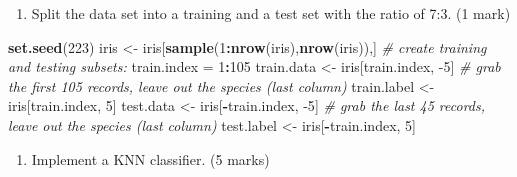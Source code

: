 \documentclass[
]{article}
\newenvironment{Shaded}{\begin{snugshade}}{\end{snugshade}}
\newcommand{\CommentTok}[1]{\textcolor[rgb]{0.56,0.35,0.01}{\textit{#1}}}
\newcommand{\DecValTok}[1]{\textcolor[rgb]{0.00,0.00,0.81}{#1}}
\newcommand{\KeywordTok}[1]{\textcolor[rgb]{0.13,0.29,0.53}{\textbf{#1}}}
\newcommand{\NormalTok}[1]{#1}
\newcommand{\OperatorTok}[1]{\textcolor[rgb]{0.81,0.36,0.00}{\textbf{#1}}}
\newcommand{\StringTok}[1]{\textcolor[rgb]{0.31,0.60,0.02}{#1}}
\providecommand{\tightlist}{%
  \setlength{\itemsep}{0pt}\setlength{\parskip}{0pt}}
\begin{document}
\begin{enumerate}
\def\labelenumi{\arabic{enumi}.}
\tightlist
\item
  Split the data set into a training and a test set with the ratio of
  7:3. (1 mark)
\end{enumerate}

\begin{Shaded}
\begin{Highlighting}[]
\KeywordTok{set.seed}\NormalTok{(}\DecValTok{223}\NormalTok{)}
\NormalTok{iris <-}\StringTok{ }\NormalTok{iris[}\KeywordTok{sample}\NormalTok{(}\DecValTok{1}\OperatorTok{:}\KeywordTok{nrow}\NormalTok{(iris),}\KeywordTok{nrow}\NormalTok{(iris)),]}
\CommentTok{# create  training and testing subsets:}
\NormalTok{train.index =}\StringTok{ }\DecValTok{1}\OperatorTok{:}\DecValTok{105}
\NormalTok{train.data <-}\StringTok{ }\NormalTok{iris[train.index, }\DecValTok{-5}\NormalTok{] }\CommentTok{# grab the first 105 records, leave out the species (last column)}
\NormalTok{train.label <-}\StringTok{ }\NormalTok{iris[train.index, }\DecValTok{5}\NormalTok{]}
\NormalTok{test.data <-}\StringTok{ }\NormalTok{iris[}\OperatorTok{-}\NormalTok{train.index, }\DecValTok{-5}\NormalTok{] }\CommentTok{# grab the last 45 records, leave out the species (last column)}
\NormalTok{test.label <-}\StringTok{ }\NormalTok{iris[}\OperatorTok{-}\NormalTok{train.index, }\DecValTok{5}\NormalTok{]}
\end{Highlighting}
\end{Shaded}

\begin{enumerate}
\def\labelenumi{\arabic{enumi}.}
\setcounter{enumi}{1}
\tightlist
\item
  Implement a KNN classifier. (5 marks)
\end{enumerate}
\end{document}
